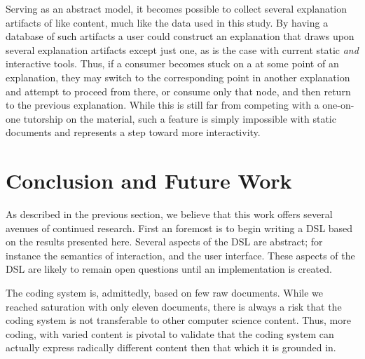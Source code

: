 \documentclass[sigconf]{acmart}
\begin{document}
Serving as an abstract model, it becomes possible to collect several explanation
artifacts of like content, much like the data used in this study. By having a
database of such artifacts a user could construct an explanation that draws upon
several explanation artifacts except just one, as is the case with current
static \emph{and} interactive tools. Thus, if a consumer becomes stuck on a
at some point of an explanation, they may switch to the corresponding point in
another explanation and attempt to proceed from there, or consume only that
node, and then return to the previous explanation. While this is still far from
competing with a one-on-one tutorship on the material, such a feature is simply
impossible with static documents and represents a step toward more interactivity.

\section{Conclusion and Future Work}

As described in the previous section, we believe that this work offers several
avenues of continued research. First an foremost is to begin writing a DSL based
on the results presented here. Several aspects of the DSL are abstract; for
instance the semantics of interaction, and the user interface. These aspects of
the DSL are likely to remain open questions until an implementation is created. 

The coding system is, admittedly, based on few raw documents. While we reached
saturation with only eleven documents, there is always a risk that the coding
system is not transferable to other computer science content. Thus, more coding,
with varied content is pivotal to validate that the coding system can actually
express radically different content then that which it is grounded in.



\end{document}
